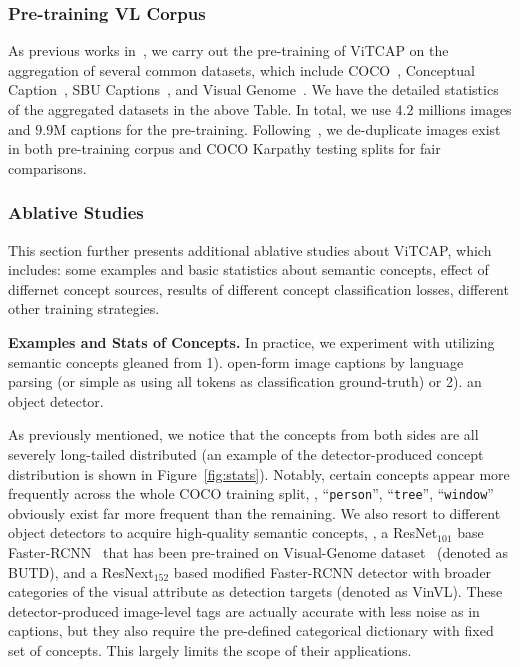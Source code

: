 \subsubsection{Pre-training VL Corpus}
As previous works in~\citep{zhang2021multi}, we carry out the pre-training of ViTCAP on the aggregation of several common datasets, which include COCO~\citep{lin2014microsoft}, Conceptual Caption~\citep{changpinyo2021conceptual}, SBU Captions~\citep{ordonez2011im2text}, and Visual Genome~\citep{krishna2017visual}. We have the detailed statistics of the aggregated datasets in the above Table. In total, we use $4.2$ millions images and $9.9$M captions for the pre-training. Following~\citep{lu202012}, we de-duplicate images exist in both pre-training corpus and COCO Karpathy testing splits for fair comparisons.



\subsubsection{Ablative Studies}
This section further presents additional ablative studies about ViTCAP, which includes: some examples and basic statistics about semantic concepts, effect of differnet concept sources, 
results of different concept classification losses, different other training strategies.



\vspace{1mm}
\noindent\textbf{Examples and Stats of Concepts.}
In practice, we experiment with utilizing semantic concepts gleaned from 1). open-form image captions by language parsing (or simple as using all tokens as classification ground-truth) or 2).  an object detector. 

As previously mentioned, we notice that the concepts from both sides are all severely long-tailed distributed (an example of the detector-produced concept distribution is shown in Figure~\ref{fig:stats}). Notably, certain concepts appear more frequently across the whole COCO training split, \eg, ``\texttt{person}'', ``\texttt{tree}'', ``\texttt{window}'' obviously exist far more frequent than the remaining.  We also resort to different object detectors to acquire high-quality semantic concepts, \ie, a ResNet$_{101}$ base Faster-RCNN~\citep{anderson2018bottom} that has been pre-trained on Visual-Genome dataset~\citep{krishna2017visual} (denoted as BUTD), and a ResNext$_{152}$ based modified Faster-RCNN detector with broader categories of the visual attribute as detection targets (denoted as VinVL). These detector-produced image-level tags are actually accurate with less noise as in captions, but they also require the pre-defined categorical dictionary with fixed set of concepts. This largely limits the scope of their applications.

